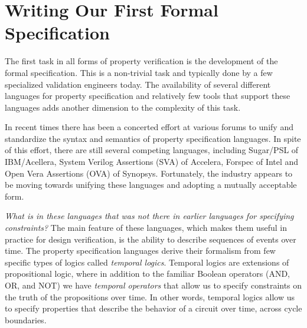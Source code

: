 \section{Writing Our First Formal Specification}
The first task in all forms of property verification is the development of
the formal specification. This is a non-trivial task and typically done by
a few specialized validation engineers today. The availability of several
different languages for property specification and relatively few tools that
support these languages adds another dimension to the complexity of this task.

In recent times there has been a concerted effort at various forums to 
unify and standardize the syntax and semantics of property specification 
languages. In spite of this effort, there are still several competing
languages, including Sugar/PSL of IBM/Acellera, System Verilog Assertions (SVA)
of Accelera, Forspec of Intel and Open Vera Assertions (OVA) of Synopsys.
Fortunately, the industry appears to be moving towards unifying these
languages and adopting a mutually acceptable form.

{\em What is in these languages that was not there in earlier languages for
specifying constraints?} The main feature of these languages, which makes 
them useful in practice for design verification, is the ability to describe
sequences of events over time. 
The property specification languages derive their formalism from few specific
types of logics called {\em temporal logics}. Temporal logics are extensions
of propositional logic, where in addition to the familiar Boolean operators
(AND, OR, and NOT) we have {\em temporal operators} that allow us to specify
constraints on the truth of the propositions over time. In other words,
temporal logics allow us to specify properties that describe the behavior of
a circuit over time, across cycle boundaries.

